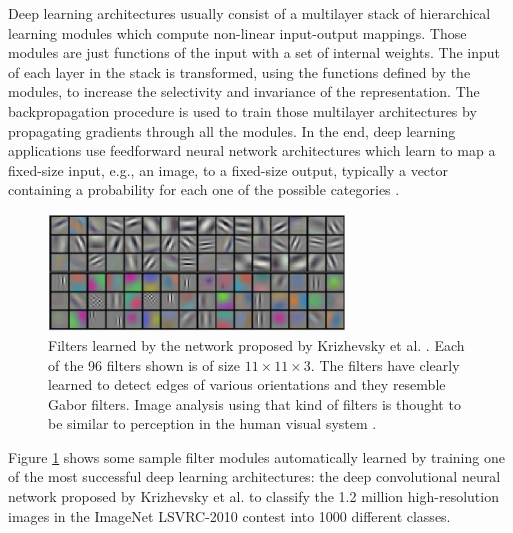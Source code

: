 Deep learning architectures usually consist of a multilayer stack of hierarchical learning modules which compute non-linear input-output mappings. Those modules are just functions of the input with a set of internal weights. The input of each layer in the stack is transformed, using the functions defined by the modules, to increase the selectivity and invariance of the representation. The backpropagation procedure is used to train those multilayer architectures by propagating gradients through all the modules. In the end, deep learning applications use feedforward neural network architectures which learn to map a fixed-size input, e.g., an image, to a fixed-size output, typically a vector containing a probability for each one of the possible categories \cite{Lecun2015}.

\begin{figure}[!b]
	\centering
	\includegraphics[width=0.7\textwidth]{Figures/ObjRecog/weights}
	\caption{Filters learned by the network proposed by Krizhevsky et al. \cite{Krizhevsky2012}. Each of the 96 filters shown is of size $11\times11\times3$. The filters have clearly learned to detect edges of various orientations and they resemble Gabor filters. Image analysis using that kind of filters is thought to be similar to perception in the human visual system \cite{Marvcelja1980}.}
	\label{fig:alexnet_weights}
\end{figure}

Figure \ref{fig:alexnet_weights} shows some sample filter modules automatically learned by training one of the most successful deep learning architectures: the deep convolutional neural network proposed by Krizhevsky et al. \cite{Krizhevsky2012} to classify the \num{1.2} million high-resolution images in the ImageNet LSVRC-2010 \cite{Berg2010} contest into \num{1000} different classes.

